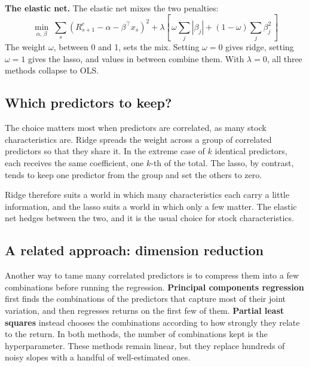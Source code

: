 \textbf{The elastic net.} The elastic net  mixes the two penalties:
\begin{equation}
  \min_{\alpha,\,\beta} \; \sum_{s} \left(R^{e}_{s+1} - \alpha - \beta^{\top} x_s\right)^2
  + \lambda \left[\, \omega \sum_{j} |\beta_j| + (1-\omega) \sum_{j} \beta_j^2 \,\right]
  \label{eq:19-enet}
\end{equation}
The weight $\omega$, between 0 and 1, sets the mix. Setting $\omega = 0$ gives ridge, setting $\omega = 1$ gives the lasso, and values in between combine them. With $\lambda = 0$, all three methods collapse to OLS.


\subsection{Which predictors to keep?}

The choice matters most when predictors are correlated, as many stock characteristics are. Ridge spreads the weight across a group of correlated predictors so that they share it. In the extreme case of $k$ identical predictors, each receives the same coefficient, one $k$-th of the total. The lasso, by contrast, tends to keep one predictor from the group and set the others to zero.

Ridge therefore suits a world in which many characteristics each carry a little information, and the lasso suits a world in which only a few matter. The elastic net hedges between the two, and it is the usual choice for stock characteristics.

\subsection{A related approach: dimension reduction}

Another way to tame many correlated predictors is to compress them into a few combinations before running the regression. \textbf{Principal components regression} first finds the combinations of the predictors that capture most of their joint variation, and then regresses returns on the first few of them. \textbf{Partial least squares} instead chooses the combinations according to how strongly they relate to the return. In both methods, the number of combinations kept is the hyperparameter. These methods remain linear, but they replace hundreds of noisy slopes with a handful of well-estimated ones.


